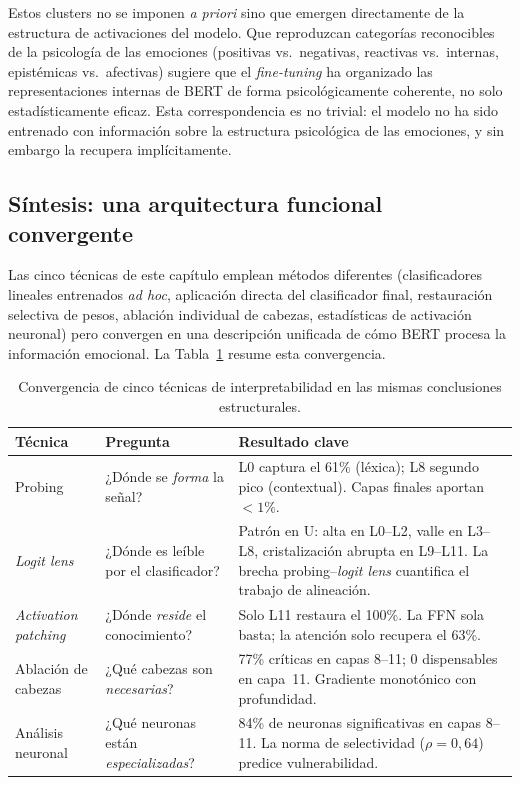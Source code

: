 Estos clusters no se imponen \emph{a priori} sino que emergen
directamente de la estructura de activaciones del modelo. Que
reproduzcan categorías reconocibles de la psicología de las
emociones (positivas vs.\ negativas, reactivas vs.\
internas, epistémicas vs.\ afectivas) sugiere que el \emph{fine-tuning} ha
organizado las representaciones internas de BERT de forma
psicológicamente coherente, no solo estadísticamente eficaz. Esta
correspondencia es no trivial: el modelo no ha sido entrenado con
información sobre la estructura psicológica de las emociones, y sin
embargo la recupera implícitamente.



\subsection{Síntesis: una arquitectura funcional convergente}
\label{sec:interp-sintesis}

Las cinco técnicas de este capítulo emplean métodos diferentes
(clasificadores lineales entrenados \textit{ad hoc}, aplicación
directa del clasificador final, restauración selectiva de pesos,
ablación individual de cabezas, estadísticas de activación neuronal)
pero convergen en una descripción unificada de cómo BERT procesa la
información emocional. La Tabla~\ref{tab:convergencia-tecnicas}
resume esta convergencia.

\begin{table}[ht]
\centering
\caption{Convergencia de cinco técnicas de interpretabilidad en las
mismas conclusiones estructurales.}
\label{tab:convergencia-tecnicas}
\small
\begin{tabular}{p{2.8cm}p{3.5cm}p{6.5cm}}
\toprule
\textbf{Técnica} & \textbf{Pregunta} & \textbf{Resultado clave} \\
\midrule
Probing &
¿Dónde se \emph{forma} la señal? &
L0 captura el 61\% (léxica); L8 segundo pico (contextual).
Capas finales aportan $< 1\%$. \\
\addlinespace
\emph{Logit lens} &
¿Dónde es leíble por el clasificador? &
Patrón en U: alta en L0--L2, valle en L3--L8, cristalización
abrupta en L9--L11. La brecha probing--\emph{logit lens} cuantifica el
trabajo de alineación. \\
\addlinespace
\emph{Activation patching} &
¿Dónde \emph{reside} el conocimiento? &
Solo L11 restaura el 100\%. La FFN sola basta;
la atención solo recupera el 63\%. \\
\addlinespace
Ablación de cabezas &
¿Qué cabezas son \emph{necesarias}? &
77\% críticas en capas 8--11; 0 dispensables en capa~11.
Gradiente monotónico con profundidad. \\
\addlinespace
Análisis neuronal &
¿Qué neuronas están \emph{especializadas}? &
84\% de neuronas significativas en capas 8--11.
La norma de selectividad ($\rho = 0{,}64$) predice vulnerabilidad. \\
\bottomrule
\end{tabular}
\end{table}

